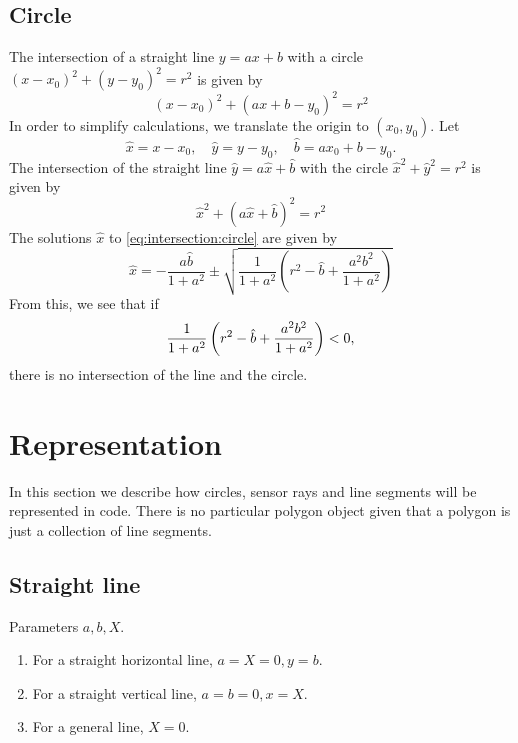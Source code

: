 \documentclass[11pt]{article}
\newcommand{\bhat}{{\hat b}}
\newcommand{\xhat}{{\hat x}}
\newcommand{\yhat}{{\hat y}}
\begin{document}
\subsection{Circle}
\label{sec:intersection:circle}
The intersection of a straight line $y=ax+b$ with a circle 
$(x-x_0)^2+(y-y_0)^2=r^2$ is given by
\begin{equation}
    (x-x_0)^2 + (ax+b - y_0)^2 = r^2 
\end{equation}
In order to simplify calculations, we translate the origin to $(x_0, y_0)$. Let
\begin{equation}
    \xhat = x-x_0,\quad \yhat = y-y_0,\quad \bhat = ax_0 + b - y_0.
\end{equation}
The intersection of the straight line $\yhat = a\xhat + \bhat$ with the circle
$\xhat^2 + \yhat^2 = r^2$ is given by
\begin{equation}
    \xhat^2 + (a\xhat + \bhat)^2 = r^2 \label{eq:intersection:circle}
\end{equation}
The solutions $\xhat$ to \eqref{eq:intersection:circle} are given by
\begin{equation}
    \xhat = -\frac{a\bhat}{1+a^2}\pm 
        \sqrt{\frac{1}{1+a^2}\left(r^2-\bhat+\frac{a^2 b^2}{1+a^2}\right)}
\end{equation}
From this, we see that if 
\begin{equation}
    \frac{1}{1+a^2}\left(r^2-\bhat+\frac{a^2 b^2}{1+a^2}\right) < 0, \notag
\end{equation}
there is no intersection of the line and the circle.

\section{Representation}
\label{sec:representation}
In this section we describe how circles, sensor rays and line segments will be
represented in code. There is no particular polygon object given that a
polygon is just a collection of line segments.

\subsection*{Straight line}

Parameters $a, b, X$. 

\begin{enumerate}
    \item For a  straight horizontal line, $a=X=0, y=b$.
    \item For a  straight vertical line, $a=b=0, x=X$.
    \item For a general line, $X=0$.
\end{enumerate}
\end{document}
